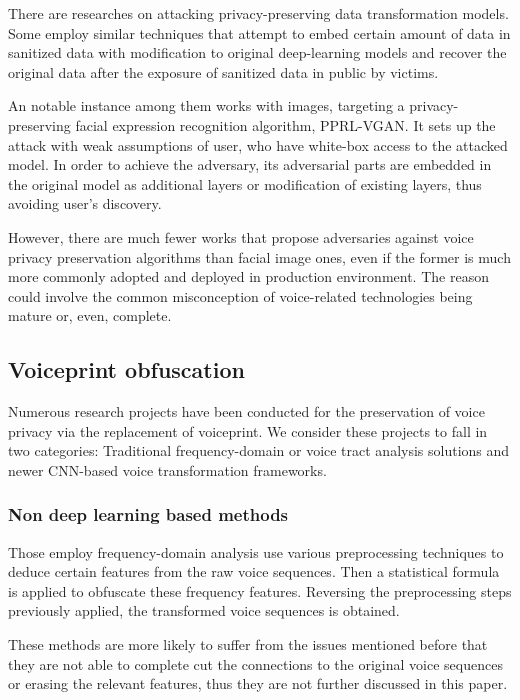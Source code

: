 \documentclass[journal]{IEEEtran} %
\begin{document}
There are researches on attacking privacy-preserving data transformation models. Some employ similar techniques that attempt to embed certain amount of data in sanitized data with modification to original deep-learning models and recover the original data after the exposure of sanitized data in public by victims. 

An notable instance among them works with images, targeting a privacy-preserving facial expression recognition algorithm, PPRL-VGAN. It sets up the attack with weak assumptions of user, who have white-box access to the attacked model. In order to achieve the adversary, its adversarial parts are embedded in the original model as additional layers or modification of existing layers, thus avoiding user's discovery.\cite{pprl-vgan,subvert}

However, there are much fewer works that propose adversaries against voice privacy preservation algorithms than facial image ones, even if the former is much more commonly adopted and deployed in production environment. The reason could involve the common misconception of voice-related technologies being mature or, even, complete.

\subsection{Voiceprint obfuscation}

Numerous research projects have been conducted for the preservation of voice privacy via the replacement of voiceprint. We consider these projects to fall in two categories: Traditional frequency-domain or voice tract analysis solutions and newer CNN-based voice transformation frameworks.

\subsubsection{Non deep learning based methods}

Those employ frequency-domain analysis use various preprocessing techniques to deduce certain features from the raw voice sequences. Then a statistical formula is applied to obfuscate these frequency features. Reversing the preprocessing steps previously applied, the transformed voice sequences is obtained.\cite{a9, a10, a11}

These methods are more likely to suffer from the issues mentioned before that they are not able to complete cut the connections to the original voice sequences or erasing the relevant features, thus they are not further discussed in this paper.
\end{document}
